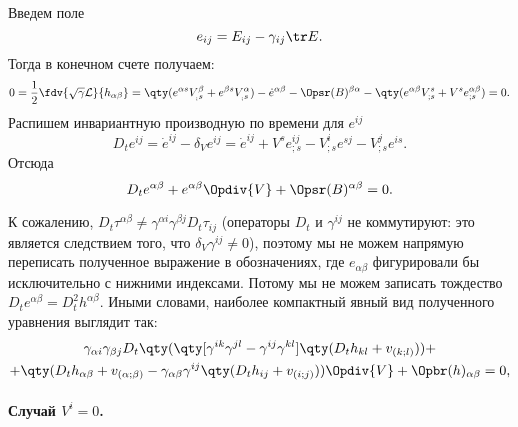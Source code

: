 \documentclass[\docroot/reports/draft/report.tex]{subfiles}
\begin{document}
    Введем поле
    \begin{equation}
        e_{ij} = E_{ij} - \gamma_{ij} \tr E .
    \end{equation}
    Тогда в конечном счете получаем:
    \begin{equation*}
        0 = \frac{1}{2}\fdv{\sqrt{\gamma}\mathcal{L}}{h_{\alpha\beta}} =
            \qty(e^{\alpha s} V^\beta_{_;s} + e^{\beta s} V^\alpha_{_;s})
                - \dot{e}^{\alpha\beta}
                - \Opsr(B)^{\beta\alpha}
                - \qty(e^{\alpha\beta} V^s_{;s} + V^s e^{\alpha\beta}_{;s}) = 0 .
    \end{equation*}
    Распишем инвариантную производную по времени для $e^{ij}$
    \begin{equation}
        D_t{e^{ij}} = \dot{e}^{ij} - \delta_V e^{ij} =
            \dot{e}^{ij} + V^s e^{ij}_{;s} - V^i_{;s} e^{sj} - V^j_{;s} e^{is} .
    \end{equation}
    Отсюда
    \begin{equation}\label{eq:breq_eBV}
        D_t{e^{\alpha\beta}} + e^{\alpha\beta} \Opdiv{V} + \Opsr(B)^{\alpha\beta} = 0 .
    \end{equation}

    К сожалению, $D_t{\tau^{\alpha\beta}} \neq \gamma^{\alpha i}\gamma^{\beta j} D_t{\tau_{ij}}$ (операторы $D_t$ и $\gamma^{ij}$ не коммутируют: это является следствием того, что $\delta_V{\gamma^{ij}} \neq 0$), поэтому мы не можем напрямую переписать полученное выражение в обозначениях, где $e_{\alpha\beta}$ фигурировали бы исключительно с нижними индексами. Потому мы не можем записать тождество $D_t{e^{\alpha\beta}} = D^2_t{h^{\alpha\beta}}$. Иными словами, наиболее компактный явный вид полученного уравнения выглядит так:
    \begin{equation}
        \begin{gathered}
            \gamma_{\alpha i}\gamma_{\beta j} D_t\qty(\qty[\gamma^{ik}\gamma^{jl} - \gamma^{ij}\gamma^{kl}] \qty(D_t{h_{kl}} + v_{(k;l)})) + \\ + \qty(D_t{h_{\alpha\beta}} + v_{(\alpha;\beta)} - \gamma_{\alpha\beta}\gamma^{ij}\qty(D_t{h_{ij}} + v_{(i;j)})) \Opdiv{V} + \Opbr(h)_{\alpha\beta} = 0 ,
        \end{gathered}
    \end{equation}

    \paragraph{Случай $V^i = 0$.}
\end{document}
